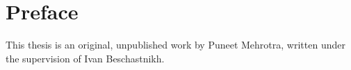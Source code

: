
\chapter{Preface}

This thesis is an original, unpublished work by Puneet Mehrotra, written under
the supervision of Ivan Beschastnikh.
